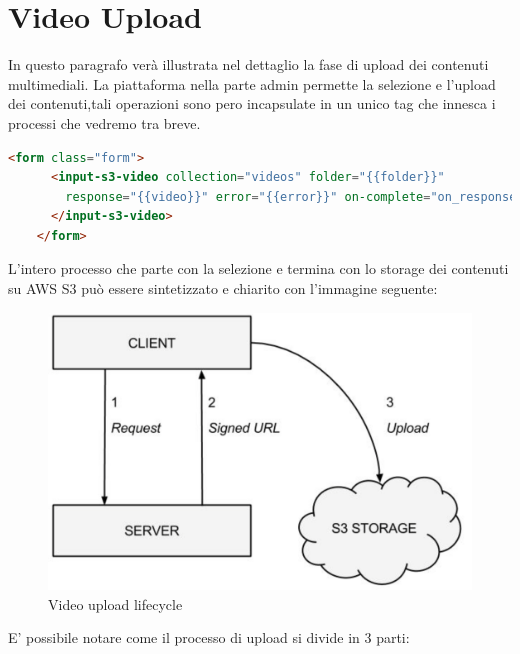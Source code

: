 \section{Video Upload}
\label{sec:video_upload}
In questo paragrafo verà illustrata nel dettaglio la fase di upload dei contenuti multimediali.
La piattaforma nella parte admin permette la selezione e l'upload dei contenuti,tali operazioni sono pero incapsulate in un unico tag che innesca i processi che vedremo tra breve. 

\begin{lstlisting}[language=html]
   <form class="form">
      <input-s3-video collection="videos" folder="{{folder}}"
        response="{{video}}" error="{{error}}" on-complete="on_response">
      </input-s3-video>
    </form>
\end{lstlisting}

L'intero processo che parte con la selezione e termina con lo storage dei contenuti su AWS S3 può essere sintetizzato e chiarito con l’immagine seguente:


\begin{figure}[htb]
 \centering
 \includegraphics[width=1.0\linewidth]{images/chapter6/upload.png}\hfill
 \caption[Video upload lifecycle]{Video upload lifecycle}
 \label{fig:fourV}
\end{figure}


E’ possibile notare come il processo di upload si divide in 3 parti: 

